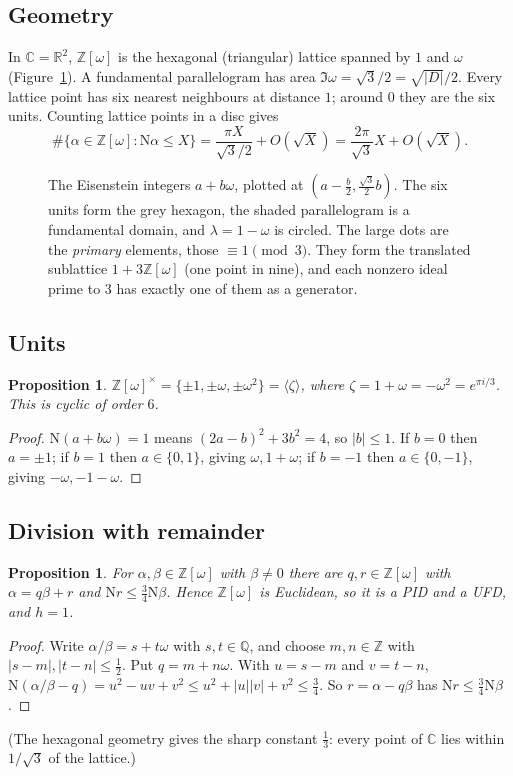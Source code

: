 \documentclass[11pt]{article}
\numberwithin{equation}{section}
\newcommand{\N}{\mathrm N}
\newcommand{\OO}{\mathbb Z[\omega]}
\newcommand{\Q}{\mathbb Q}
\newcommand{\Z}{\mathbb Z}
\newtheorem{proposition}[theorem]{Proposition}
\theoremstyle{definition}
\theoremstyle{remark}
\begin{document}
\subsection{Geometry}
In $\mathbb C=\mathbb R^2$, $\OO$ is the hexagonal (triangular) lattice spanned by $1$ and $\omega$
(Figure~\ref{fig:lattice}). A fundamental parallelogram has area $\Im\omega=\sqrt3/2=\sqrt{|D|}/2$.
Every lattice point has six nearest neighbours at distance $1$; around $0$ they are the six
units. Counting lattice points in a disc gives
\begin{equation}\label{eq:latticecount}
 \#\{\alpha\in\OO:\N\alpha\le X\}=\frac{\pi X}{\sqrt3/2}+O(\sqrt X)=\frac{2\pi}{\sqrt3}X+O(\sqrt X).
\end{equation}

\begin{figure}[ht]
\centering

\caption{The Eisenstein integers $a+b\omega$, plotted at $(a-\frac b2,\frac{\sqrt3}2b)$.
The six units form the grey hexagon, the shaded parallelogram is a fundamental domain, and
$\lambda=1-\omega$ is circled. The large dots are the \emph{primary} elements, those
$\equiv1\pmod 3$. They form the translated sublattice $1+3\OO$ (one point in nine), and
each nonzero ideal prime to $3$ has exactly one of them as a generator.}
\label{fig:lattice}
\end{figure}

\subsection{Units}
\begin{proposition}
$\OO^\times=\{\pm1,\pm\omega,\pm\omega^2\}=\langle\zeta\rangle$, where $\zeta=1+\omega=-\omega^2=e^{\pi i/3}$.
This is cyclic of order $6$.
\end{proposition}
\begin{proof}
$\N(a+b\omega)=1$ means $(2a-b)^2+3b^2=4$, so $|b|\le1$. If $b=0$ then $a=\pm1$; if $b=1$ then
$a\in\{0,1\}$, giving $\omega,1+\omega$; if $b=-1$ then $a\in\{0,-1\}$, giving $-\omega,-1-\omega$.
\end{proof}

\subsection{Division with remainder}
\begin{proposition}\label{prop:euclid}
For $\alpha,\beta\in\OO$ with $\beta\ne0$ there are $q,r\in\OO$ with $\alpha=q\beta+r$ and
$\N r\le\frac34\N\beta$. Hence $\OO$ is Euclidean, so it is a PID and a UFD, and $h=1$.
\end{proposition}
\begin{proof}
Write $\alpha/\beta=s+t\omega$ with $s,t\in\Q$, and choose $m,n\in\Z$ with $|s-m|,|t-n|\le\frac12$.
Put $q=m+n\omega$. With $u=s-m$ and $v=t-n$,
$\N(\alpha/\beta-q)=u^2-uv+v^2\le u^2+|u||v|+v^2\le\frac34$. So $r=\alpha-q\beta$ has
$\N r\le\frac34\N\beta$.
\end{proof}
(The hexagonal geometry gives the sharp constant $\frac13$: every point of $\mathbb C$ lies
within $1/\sqrt3$ of the lattice.)
\end{document}
